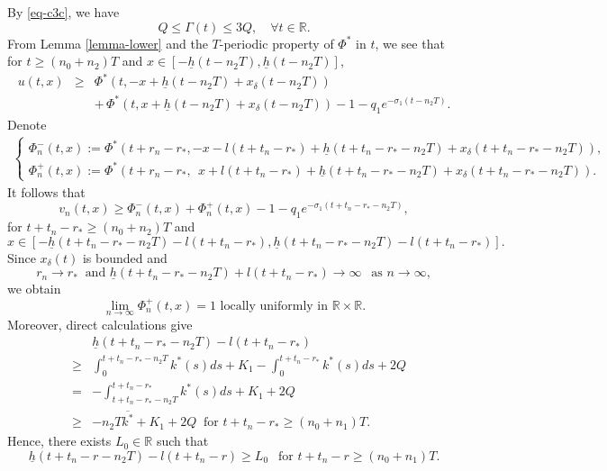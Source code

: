 \documentclass[11pt]{amsart}
\numberwithin{equation}{section}
\begin{document}
 
By \eqref{eq-c3c}, we have
\[Q\leq \Gamma(t)\leq 3 Q, \quad\forall t\in\mathbb R.\]
From Lemma \ref{lemma-lower} and the $T$-periodic property of $\Phi^*$ in $t$, we see that for $t\geq (n_0+n_2)T$ and $x\in[-\underline{h}(t-n_2T),\underline{h}(t-n_2T)]$,
  \begin{eqnarray*}
  u(t,x)&\geq & \Phi^*(t, -x+\underline{h}(t-n_2T)+x_\delta(t-n_2T))\\
  &&+\, \Phi^*(t, x+\underline{h}(t-n_2T)+x_\delta(t-n_2T)) -1-q_1e^{-\sigma_1(t-n_2T)}.
\end{eqnarray*}
Denote 
{\small\begin{eqnarray*}\begin{cases}
  \Phi_n^-(t,x):=\Phi^*(t+r_n-r_*,-x-l(t+t_n-r_*)+\underline{h}(t+t_n-r_*-n_2T)+x_\delta(t+t_n-r_*-n_2T)),\\
  \Phi_n^+(t,x):=\Phi^*(t+r_n-r_*,\ \ x+l(t+t_n-r_*)+\underline{h}(t+t_n-r_*-n_2T)+x_\delta(t+t_n-r_*-n_2T)).
  \end{cases}
\end{eqnarray*}}
It follows that   
 \begin{equation}\label{eq-vn} 
  v_n(t,x)\geq \Phi_n^-(t,x)+\Phi_n^+(t,x)-1- q_1e^{-\sigma_1(t+t_n-r_*-n_2T)},
 \end{equation}
 for $t+t_n-r_*\geq (n_0+n_2)T$ and
\[
 x\in[-\underline{h}(t+t_n-r_*-n_2T)-l(t+t_n-r_*),\underline{h}(t+t_n-r_*-n_2T)-l(t+t_n-r_*)].
\]
 Since $x_\delta(t)$ is bounded and 
 \begin{equation*}
  r_n\to r_*  ~\text{ and }  \underline{h}(t+t_n-r_*-n_2T)+l(t+t_n-r_*)\to \infty ~~\text{ as }n\to\infty,
 \end{equation*}
 we obtain 
 \begin{equation*}
  \lim_{n\to\infty}\Phi_n^+(t,x)=1 \text{ locally uniformly in } \mathbb{R}\times\mathbb{R}.
 \end{equation*}
Moreover, direct calculations give
\begin{eqnarray*}
  &&\underline{h}(t+t_n-r_*-n_2T)-l(t+t_n-r_*)\\
  &\geq& \int_{0}^{t+t_n-r_*-n_2T}k^*(s)ds+K_1-\int_{0}^{t+t_n-r_*}k^*(s)ds+2Q\\
&=&-\int_{t+t_n-r_*-n_2T}^{t+t_n-r_*}k^*(s)ds+K_1+2Q\\
&\geq &-n_2T\overline{k^*} +K_1+2Q~ \text{ for }t+t_n-r_*\geq (n_0+n_1)T.
\end{eqnarray*}
Hence, there exists $L_0\in \mathbb R$  such that 
\begin{equation*}
  \underline{h}(t+t_n-r-n_2T)-l(t+t_n-r)\geq L_0 ~~\text{ for  }t+t_n-r\geq (n_0+n_1)T.
\end{equation*}
\end{document}
